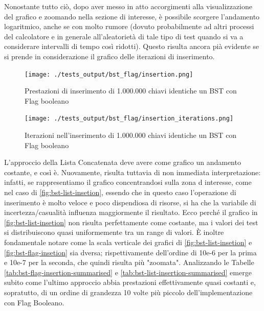\documentclass{article}
\begin{document}
Nonostante tutto ciò, dopo aver messo in atto accorgimenti alla visualizzazione del grafico e zoomando nella sezione di interesse, è possibile scorgere l'andamento logaritmico, anche se con molto rumore (dovuto probabilmente ad altri processi del calcolatore e in generale all'aleatorietà di tale tipo di test quando si va a considerare intervalli di tempo così ridotti).
Questo risulta ancora pià evidente se si prende in considerazione il grafico delle iterazioni di inserimento.

\begin{figure}[htbp]
 \begin{minipage}{0.5\textwidth}
    \centering
    \texttt{[image: ./tests\_output/bst\_flag/insertion.png]}
    \caption{Prestazioni di inserimento di 1.000.000 chiavi identiche un BST con Flag booleano}
    \label{fig:bst-flag-insetion}
  \end{minipage}
      \hspace{0.05\textwidth}
  \begin{minipage}{0.5\textwidth}
    \centering
    \texttt{[image: ./tests\_output/bst\_flag/insertion\_iterations.png]}
    \caption{Iterazioni nell'inserimento di 1.000.000 chiavi identiche un BST con Flag booleano}
    \label{fig:bst-flag-insetion-iterations}
  \end{minipage}%
\end{figure}

\vspace{10px}
L'approccio della Lista Concatenata deve avere come grafico un andamento costante, e così è. Nuovamente, risulta tuttavia di non immediata interpretazione: infatti, se rappresentiamo il grafico concentrandosi sulla zona d interesse, come nel caso di \cref{fig:bst-list-insetion}, essendo che in questo caso l'operazione di inserimento è molto veloce e poco dispendiosa di risorse, si ha che la variabile di incertezza/casualità influenza maggiormente il risultato.
Ecco perché il grafico in \cref{fig:bst-list-insetion} non risulta perfettamente come costante, ma i valori dei test si distribuiscono quasi uniformemente tra un range di valori. È inoltre fondamentale notare come la scala verticale dei grafici di   \cref{fig:bst-list-insetion} e  \cref{fig:bst-flag-insetion} sia dversa; rispettivamente dell'ordine di 10e-6 per la prima e 10e-7 per la seconda, che quindi risulta più "zoomata". Analizzando le Tabelle \ref{tab:bst-flag-insertion-summarised} e \ref{tab:bst-list-insertion-summarised} emerge subito come l'ultimo approccio abbia prestazioni effettivamente quasi costanti e, sopratutto, di un ordine di grandezza 10 volte più piccolo dell'implementazione con Flag Booleano.
\end{document}
